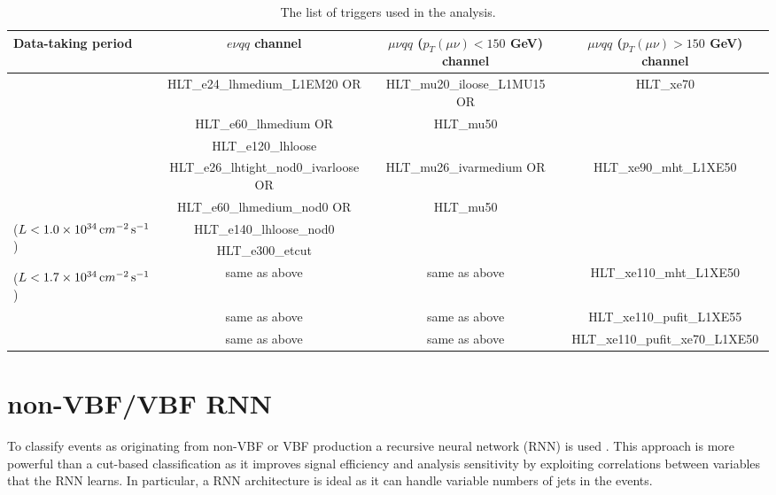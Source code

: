 \begin{landscape}
\begin{table}[p]
  \caption{The list of triggers used in the analysis.} \label{tbl:triggers}
\begin{center} 
\small
\begin{tabular}{|l|c|c|c|}
\hline
Data-taking period & $e\nu qq$ channel & $\mu\nu qq$ ($p_{T}(\mu\nu)<150$ GeV) channel & $\mu\nu qq$ ($p_{T}(\mu\nu) > 150$ GeV) channel  \\
\hline
\hline
\multirow{3}{*}{\centering {2015}} & HLT\_e24\_lhmedium\_L1EM20 OR & HLT\_mu20\_iloose\_L1MU15 OR & \multirow{3}{*}{ HLT\_xe70 } \\
 & HLT\_e60\_lhmedium OR & HLT\_mu50 & \\
 & HLT\_e120\_lhloose & & \\
\hline
\multirow{2}{*}{\centering {2016a (run $< 302919$)}} & HLT\_e26\_lhtight\_nod0\_ivarloose OR & HLT\_mu26\_ivarmedium OR  & \multirow{3}{*}{ HLT\_xe90\_mht\_L1XE50 } \\
 & HLT\_e60\_lhmedium\_nod0 OR & HLT\_mu50 &  \\ 
\multirow{2}{*}{($L<1.0\times10^{34}\,{\textrm cm}^{-2}\,{\textrm s}^{-1}$)} & HLT\_e140\_lhloose\_nod0 & & \\
 & HLT\_e300\_etcut & & \\
\hline
{\centering {2016b (run $\geq 302919$)}} & \multirow{2}{*}{same as above} & \multirow{2}{*}{same as above}  &  \multirow{2}{*}{HLT\_xe110\_mht\_L1XE50} \\
($L<1.7\times10^{34}\,{\textrm cm}^{-2}\,{\textrm s}^{-1}$) & & &\\
\hline
{\centering {2017}} & same as above & same as above  &  HLT\_xe110\_pufit\_L1XE55 \\
\hline
{\centering {2018}} & same as above & same as above  &  HLT\_xe110\_pufit\_xe70\_L1XE50  \\
\hline
\end{tabular}
\end{center}
\end{table}
\end{landscape}
\section{non-VBF/VBF RNN}
\label{rnn}
To classify events as originating from non-VBF or VBF production a recursive neural network (RNN) is used \cite{rnn}. This approach is more powerful than a cut-based classification as it improves signal efficiency and analysis sensitivity by exploiting correlations between variables that the RNN learns. In particular, a RNN architecture is ideal as it can handle variable numbers of jets in the events.  

